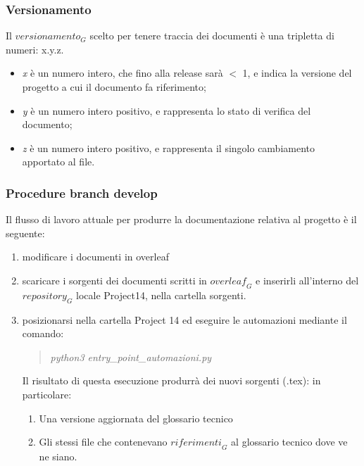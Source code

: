 \subsubsection{Versionamento}

Il $\textit{versionamento}_G$ scelto per tenere traccia dei documenti è una tripletta di numeri: x.y.z.

\begin{itemize}
    \item \textit{x} è un numero intero, che fino alla release sarà $<$ 1, e indica la versione del progetto a cui il documento fa riferimento;
    \item \textit{y} è un numero intero positivo, e rappresenta lo stato di verifica del documento;
    \item \textit{z} è un numero intero positivo, e rappresenta il singolo cambiamento apportato al file.
\end{itemize}


\subsubsection{Procedure branch develop }

Il flusso di lavoro attuale per produrre la documentazione relativa al progetto è il seguente:
\begin{enumerate}
    \item modificare i documenti in overleaf
    \item scaricare i sorgenti dei documenti scritti in $\textit{overleaf}_G$ e inserirli all'interno del $\textit{repository}_G$ locale Project14, nella cartella sorgenti.
    \item posizionarsi nella cartella Project 14 ed eseguire le automazioni mediante il comando:
        \begin{quote}
            \emph{  python3 entry\_point\_automazioni.py} 
        \end{quote}
    Il risultato di questa esecuzione produrrà dei nuovi sorgenti (.tex): in particolare:
    \begin{enumerate}
        \item Una versione aggiornata del glossario tecnico
        \item Gli stessi file che contenevano $\textit{riferimenti}_G$ al glossario tecnico dove ve ne siano.
    \end{enumerate}
\end{enumerate}

